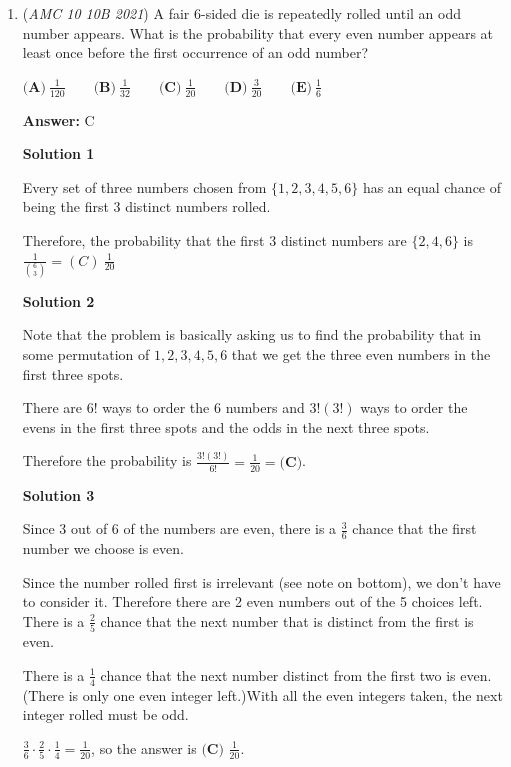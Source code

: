 \begin{enumerate}
	\item (\textit{AMC 10 10B 2021}) A fair $6$-sided die is repeatedly rolled until an odd number appears. What is the probability that every even number appears at least once before the first occurrence of an odd number?


 $\textbf{(A)} ~\frac{1}{120} \qquad\textbf{(B)} ~\frac{1}{32} \qquad\textbf{(C)} ~\frac{1}{20} \qquad\textbf{(D)} ~\frac{3}{20} \qquad\textbf{(E)} ~\frac{1}{6}$

 \textbf{Answer: }C



\textbf{Solution 1}

Every set of three numbers chosen from $\{1,2,3,4,5,6\}$ has an equal chance of being the first 3 distinct numbers rolled.

 Therefore, the probability that the first 3 distinct numbers are $\{2,4,6\}$ is $\frac{1}{{6 \choose 3}}=\boxed{(C)~\frac{1}{20}}$




\textbf{Solution 2}

Note that the problem is basically asking us to find the probability that in some permutation of $1,2,3,4,5,6$ that we get the three even numbers in the first three spots.

 There are $6!$ ways to order the $6$ numbers and $3!(3!)$ ways to order the evens in the first three spots and the odds in the next three spots.

 Therefore the probability is $\frac{3!(3!)}{6!} = \frac{1}{20} = \boxed{\textbf{(C)}}$.

 



\textbf{Solution 3}

Since $3$ out of $6$ of the numbers are even, there is a $\frac36$ chance that the first number we choose is even. 

 Since the number rolled first is irrelevant (see note on bottom), we don't have to consider it. Therefore there are 2 even numbers out of the 5 choices left. There is a $\frac{2}{5}$ chance that the next number that is distinct from the first is even. 

 There is a $\frac{1}{4}$ chance that the next number distinct from the first two is even. (There is only one even integer left.)With all the even integers taken, the next integer rolled must be odd.

 $\frac{3}{6} \cdot \frac{2}{5} \cdot \frac{1}{4} = \frac{1}{20}$, so the answer is $\boxed{\textbf{(C) }\frac{1}{20}}.$


\end{enumerate}
